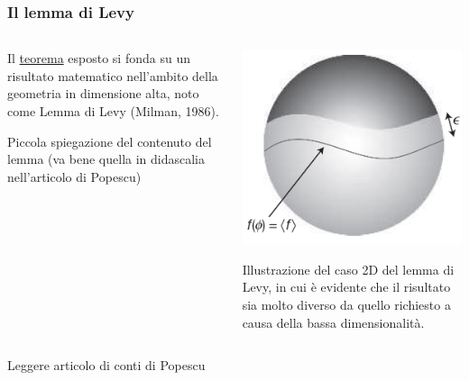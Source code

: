 \documentclass{beamer}
\theoremstyle{definition}
\theoremstyle{plain}
\begin{document}
\begin{frame}
	\transwipe
	\frametitle{Il lemma di Levy}
	\hypertarget{LevyLemma}{}
	
	\begin{columns}
		\begin{column}{0.6\textwidth}
			Il \hyperlink{th}{teorema} esposto si fonda su un risultato matematico nell'ambito della geometria in dimensione alta, noto come Lemma di Levy (Milman, 1986).
			
			\alert{Piccola spiegazione del contenuto del lemma (va bene quella in didascalia nell'articolo di Popescu)}
		\end{column}
		\begin{column}{0.4\textwidth}
			\includegraphics[width=\columnwidth]{./Images/Levy2D.png}
			
			{\footnotesize Illustrazione del caso 2D del lemma di Levy, in cui è evidente che il risultato sia molto diverso da quello richiesto a causa della bassa dimensionalità.}
		\end{column}
	\end{columns}
	
	\alert{Leggere articolo di conti di Popescu}
\end{frame}
\end{document}
